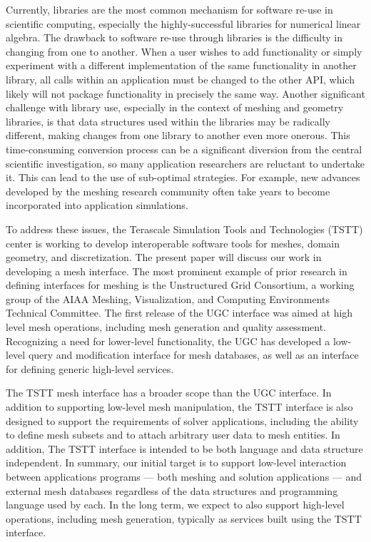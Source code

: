 Currently, libraries are the most common mechanism for software re-use
in scientific computing, especially the highly-successful libraries for
numerical linear algebra\cite{petsc,BaGr97,eispack,lapack,linpack}.
The drawback to software re-use through libraries is the difficulty in
changing from one to another. When a user wishes to add functionality or
simply experiment with a different implementation of the same
functionality in another library, all calls within an application must
be changed to the other API, which likely will not package functionality
in precisely the same way. Another significant challenge with library
use, especially in the context of meshing and geometry libraries, is
that data structures used within the libraries may be radically
different, making changes from one library to another even more onerous.
This time-consuming conversion process can be a significant diversion
from the central scientific investigation, so many application
researchers are reluctant to undertake it. This can lead to the use of
sub-optimal strategies.  For example, new advances developed by the
meshing research community often take years to become incorporated into
application simulations.

To address these issues, the Terascale Simulation Tools and Technologies
(TSTT) center is working to develop interoperable software tools for
meshes, domain geometry, and discretization\cite{tstt:overview}.  The
present paper will discuss our work in developing a mesh interface.  The
most prominent example of prior research in defining interfaces for
meshing is the Unstructured Grid Consortium, a working group of the AIAA
Meshing, Visualization, and Computing Environments Technical
Committee\cite{UGC-web}.  The first release of the UGC
interface\cite{UGC-v1} was aimed at high level mesh operations,
including mesh generation and quality assessment.  Recognizing a need
for lower-level functionality, the UGC has developed a low-level query
and modification interface for mesh databases, as well as an interface
for defining generic high-level services\cite{UGC-v2:paper}.

The TSTT mesh interface has a broader scope than the UGC interface.  In
addition to supporting low-level mesh manipulation, the TSTT interface
is also designed to support the requirements of solver applications,
including the ability to define mesh subsets and to attach arbitrary
user data to mesh entities.  In addition, The TSTT interface is intended
to be both language and data structure independent.  In summary, our
initial target is to support low-level interaction between applications
programs --- both meshing and solution applications --- and external
mesh databases regardless of the data structures and programming
language used by each.  In the long term, we expect to also support
high-level operations, including mesh generation, typically as services
built using the TSTT interface.

